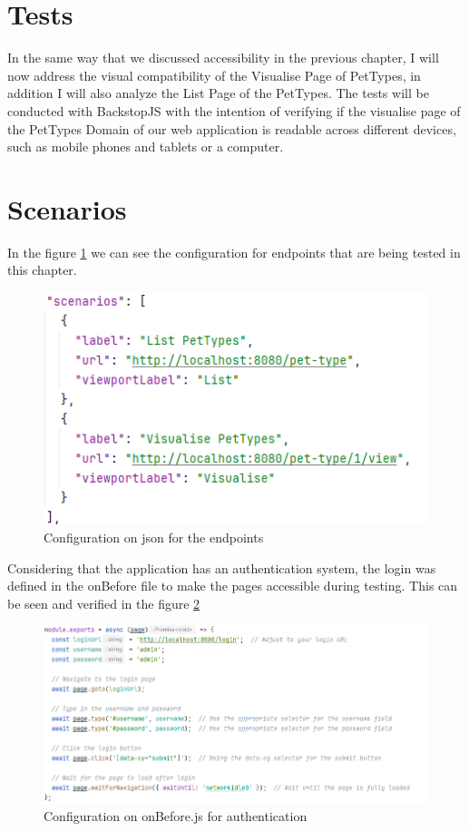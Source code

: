 \documentclass[a4paper,11pt,openright,BCOR=15mm]{scrbook}
\begin{document}
\section{Tests}
In the same way that we discussed accessibility in the previous chapter, I will now address the visual compatibility of the Visualise Page of PetTypes, in addition I will also analyze the List Page of the PetTypes.
The tests will be conducted with BackstopJS with the intention of verifying if the visualise page of the PetTypes Domain of our web application is readable across different devices, such as mobile phones and tablets or a computer.



\section{Scenarios}
In the figure \ref{fig:Scenarios} we can see the configuration for endpoints that are being tested in this chapter.


\begin{figure}[H]
	\centering
	\includegraphics[width=.7\textwidth]{figs/Visual compatibility/Scenarios.png}
	\caption{Configuration on json for the endpoints}
	\label{fig:Scenarios}
\end{figure}
Considering that the application has an authentication system, the login was defined in the onBefore file to make the pages accessible during testing. This can be seen and verified in the figure \ref{fig:onBefore}
\begin{figure}[H]
	\centering
	\includegraphics[width=.7\textwidth]{figs/Visual compatibility/onBefore.png}
	\caption{Configuration on onBefore.js for authentication}
	\label{fig:onBefore}
\end{figure}
\end{document}
